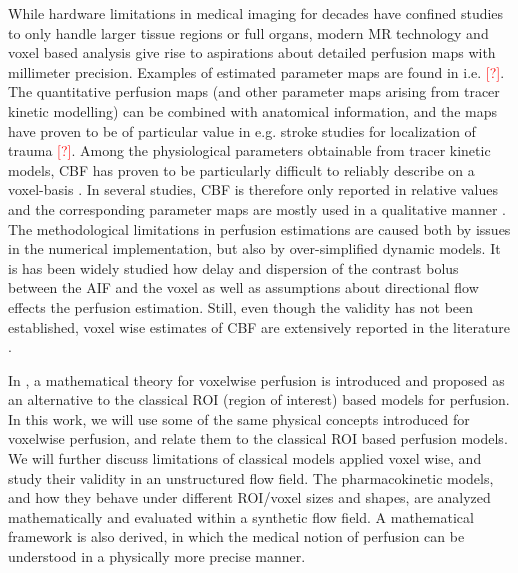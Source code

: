 \documentclass[paper=a4, fontsize=11pt,parskip=half,headings=small]{scrartcl}
\newcommand{\missingsource}{\textcolor{red}{[?]}}
\begin{document}
	While hardware limitations in medical imaging for decades have confined studies to only handle larger tissue regions or full organs, modern MR technology and voxel based analysis give rise to aspirations about detailed perfusion maps with millimeter precision.  
	Examples of estimated parameter maps are found in i.e. \missingsource. The quantitative perfusion maps (and other parameter maps arising from tracer kinetic modelling) can be combined with anatomical information, and the maps have proven to be of particular value in e.g. stroke studies for localization of trauma \missingsource. 
	Among the physiological parameters obtainable from tracer kinetic models, CBF has proven to be particularly difficult to reliably describe on a voxel-basis \cite{kudo10}. 	In several studies, CBF is therefore only reported in relative values and the corresponding parameter maps are mostly used in a qualitative manner \cite{calamante99}.
	The methodological limitations in perfusion estimations are caused both by issues in the numerical implementation, but also by over-simplified dynamic models.  
	It is has been widely studied how delay and dispersion of the contrast bolus between the AIF and the voxel as well as assumptions about directional flow \cite{thacker03,sourbron14} effects the perfusion estimation. 
 	Still, even though the validity has not been established, voxel wise estimates of CBF are extensively reported in the literature \cite{Warwick2008, Arkink2012,White2012,Feng2013,Chen2011}.
	
	In \cite{sourbron14}, a mathematical theory for voxelwise perfusion is introduced and proposed as an alternative to the classical ROI (region of interest) based models for perfusion. 
	In this work, we will use some of the same physical concepts introduced for voxelwise perfusion, and relate them to the classical ROI based perfusion models.  
	We will further discuss limitations of classical models applied voxel wise, and study their validity in an unstructured flow field.
	The pharmacokinetic models, and how they behave under different ROI/voxel sizes and shapes, are analyzed mathematically and evaluated within a synthetic flow field.  
	A mathematical framework is also derived, in which the medical notion of perfusion can be understood in a physically more precise manner.
\end{document}
